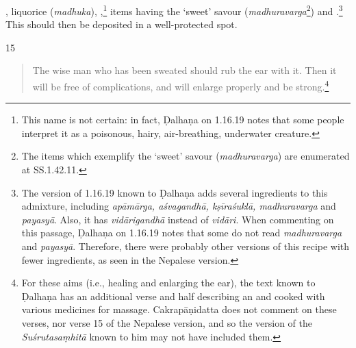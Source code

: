 \begin{translation}
    ,
    liquorice (\emph{madhuka}),
    ,\footnote{This name is not
    certain: in fact, Ḍalhaṇa on 1.16.19 \citep[79]{vulgate} notes that some people interpret
    it as a poisonous, hairy, air-breathing, underwater creature.}
    items having the `sweet' savour (\emph{madhuravarga}\footnote{The
    items which exemplify the `sweet' savour \label{kakolyadi}
    (\emph{madhuravarga}) are enumerated at SS.1.42.11.}) and .\footnote{The version of 1.16.19 known to Ḍalhaṇa \citep[79]{vulgate} adds several ingredients to this admixture, including \emph{apāmārga, aśvagandhā, kṣīraśuklā, madhuravarga} and \emph{payasyā}. Also, it has \emph{vidārigandhā} instead of \emph{vidāri}. When commenting on this passage, Ḍalhaṇa on 1.16.19 \citep[79]{vulgate} notes that some do not read \emph{madhuravarga} and \emph{payasyā}. Therefore, there were probably other versions of this recipe with fewer ingredients, as seen in the Nepalese version.}
    This should then be deposited in a well-protected spot.
    
    \item[15]%
    \begin{verse}
        
        The wise man who has been sweated should rub the  ear with 
        it. 
        Then it will be free of complications, and will enlarge properly and be strong.\footnote{For these aims (i.e., healing and enlarging the ear), the text known to Ḍalhaṇa \citep[79]{vulgate} has an additional verse and half describing an  and  cooked with various medicines for massage. Cakrapāṇidatta \citep[131]{acar-1939} does not comment on these verses, nor verse 15 of the Nepalese version, and so the version of the \emph{Suśrutasaṃhitā} known to him may not have included them.}
    \end{verse}
    

\end{translation}
